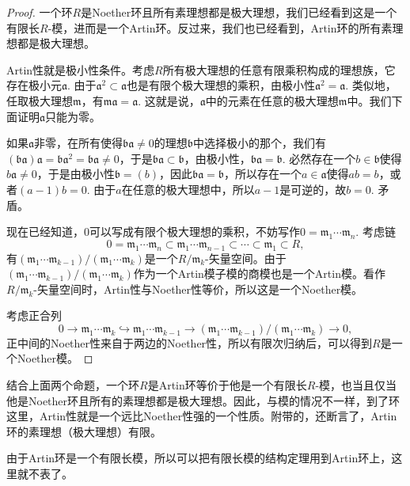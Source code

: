 \begin{proof}
	一个环$R$是Noether环且所有素理想都是极大理想，我们已经看到这是一个有限长$R$-模，进而是一个Artin环。反过来，我们也已经看到，Artin环的所有素理想都是极大理想。

	Artin性就是极小性条件。考虑$R$所有极大理想的任意有限乘积构成的理想族，它存在极小元$\mathfrak{a}$. 由于$\mathfrak{a}^2\subset \mathfrak{a}$也是有限个极大理想的乘积，由极小性$\mathfrak{a}^2=\mathfrak{a}$. 类似地，任取极大理想$\mathfrak{m}$，有$\mathfrak{m}\mathfrak{a}=\mathfrak{a}$. 这就是说，$\mathfrak{a}$中的元素在任意的极大理想$\mathfrak{m}$中。我们下面证明$\mathfrak{a}$只能为零。

	如果$\mathfrak{a}$非零，在所有使得$\mathfrak{b}\mathfrak{a}\neq 0$的理想$\mathfrak{b}$中选择极小的那个，我们有$(\mathfrak{b}\mathfrak{a})\mathfrak{a}=\mathfrak{b}\mathfrak{a}^2=\mathfrak{b}\mathfrak{a}\neq 0$，于是$\mathfrak{b}\mathfrak{a}\subset \mathfrak{b}$，由极小性，$\mathfrak{b}\mathfrak{a}=\mathfrak{b}$. 必然存在一个$b\in\mathfrak{b}$使得$b\mathfrak{a}\neq 0$，于是由极小性$\mathfrak{b}=(b)$，因此$\mathfrak{b}\mathfrak{a}=\mathfrak{b}$，所以存在一个$a\in \mathfrak{a}$使得$ab=b$，或者$(a-1)b=0$. 由于$a$在任意的极大理想中，所以$a-1$是可逆的，故$b=0$. 矛盾。

	现在已经知道，$0$可以写成有限个极大理想的乘积，不妨写作$0=\mathfrak{m}_1\cdots \mathfrak{m}_n$. 考虑链
	\[
	0=\mathfrak{m}_1\cdots \mathfrak{m}_n\subset \mathfrak{m}_1\cdots \mathfrak{m}_{n-1}\subset \cdots\subset \mathfrak{m}_1\subset R,
	\]
	有$(\mathfrak{m}_1\cdots \mathfrak{m}_{k-1})/(\mathfrak{m}_1\cdots \mathfrak{m}_{k})$是一个$R/\mathfrak{m}_{k}$-矢量空间。由于$(\mathfrak{m}_1\cdots \mathfrak{m}_{k-1})/(\mathfrak{m}_1\cdots \mathfrak{m}_{k})$作为一个Artin模子模的商模也是一个Artin模。看作$R/\mathfrak{m}_{k}$-矢量空间时，Artin性与Noether性等价，所以这是一个Noether模。

	考虑正合列
	\[
	0\to \mathfrak{m}_1\cdots \mathfrak{m}_{k}\hookrightarrow\mathfrak{m}_1\cdots \mathfrak{m}_{k-1}\to (\mathfrak{m}_1\cdots \mathfrak{m}_{k-1})/(\mathfrak{m}_1\cdots \mathfrak{m}_{k})\to 0,
	\]
	正中间的Noether性来自于两边的Noether性，所以有限次归纳后，可以得到$R$是一个Noether模。
\end{proof}

\para 结合上面两个命题，一个环$R$是Artin环等价于他是一个有限长$R$-模，也当且仅当他是Noether环且所有的素理想都是极大理想。因此，与模的情况不一样，到了环这里，Artin性就是一个远比Noether性强的一个性质。附带的，还断言了，Artin环的素理想（极大理想）有限。

由于Artin环是一个有限长模，所以可以把有限长模的结构定理用到Artin环上，这里就不表了。
